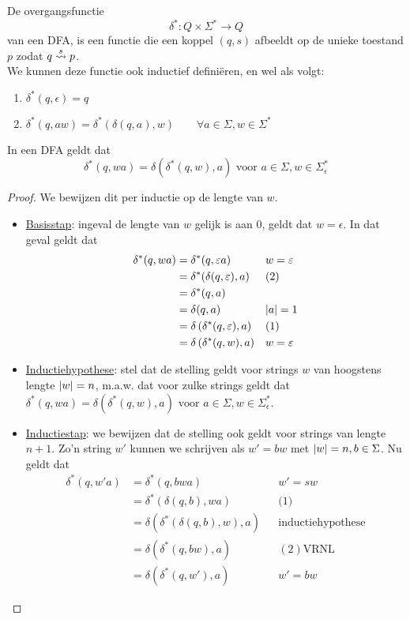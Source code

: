 \documentclass[../aanvullingen_cursus.tex]{subfiles}
\begin{document}
De overgangsfunctie \[ \delta^* : Q \times \Sigma^* \to Q\] van een DFA, is een functie die een koppel \((q,s)\) afbeeldt op de unieke toestand \(p\) zodat \(q \overset{s}{\rightsquigarrow} p\). \\We kunnen deze functie ook inductief definiëren, en wel als volgt:
\begin{enumerate}
	\item \( \delta^*(q,\epsilon)=q \)
	\item \( \delta^*(q,aw) = \delta^*(\delta(q,a),w) \qquad \forall a\in\Sigma, w\in\Sigma^*\)
\end{enumerate}


\begin{stelling}
	In een DFA geldt dat \[\delta^*(q,wa) = \delta\left(\delta^*(q,w),a\right) \text{ voor } a\in\Sigma, w\in\Sigma_{\epsilon}^*\]
\end{stelling}


\begin{proof}

	We bewijzen dit per inductie op de lengte van \(w\).

	\begin{itemize}
		\item \underline{Basisstap}: ingeval de lengte van \(w\) gelijk is aan 0, geldt dat \(w=\epsilon\). In dat geval geldt dat
		\begin{align*}
			\delta^*(q,wa) &= \delta^*(q,\varepsilon a) && w=\varepsilon \\
							&= \delta^*(\delta(q,\varepsilon),a) && \text{(2)} \\
							&= \delta^*(q,a) \\
							&= \delta(q,a) && \lvert a \rvert=1 \\
							&= \delta\left(\delta^*(q,\varepsilon),a\right) && \text{(1)} \\
							&= \delta\left(\delta^*(q,w),a\right) && w=\varepsilon
		\end{align*}
		\item \underline{Inductiehypothese}: stel dat de stelling geldt voor strings \(w\) van hoogstens lengte \(\lvert w \rvert=n\), m.a.w. dat voor zulke strings geldt dat \(\delta^*(q,wa) = \delta\left(\delta^*(q,w),a\right) \text{ voor } a\in\Sigma, w\in\Sigma_{\epsilon}^*\).
		\item \underline{Inductiestap}: we bewijzen dat de stelling ook geldt voor strings van lengte \(n+1\). Zo'n string \(w'\) kunnen we schrijven als \(w'=bw\) met \(\lvert w \rvert=n,b\in \Sigma\). Nu geldt dat
		\begin{align*}
			\delta^*(q,w'a) &= \delta^*(q, bwa) && w'=sw \\
			&= \delta^*(\delta(q,b), wa) && \text{(1)} \\
			&= \delta(\delta^*(\delta(q,b),w), a) && \text{inductiehypothese} \\
			&= \delta\left(\delta^*(q,bw),a\right) && (2) \text{VRNL} \\
			&= \delta\left(\delta^*(q,w'),a\right) && w'=bw
		\end{align*}
	\end{itemize}

\end{proof}
\end{document}
